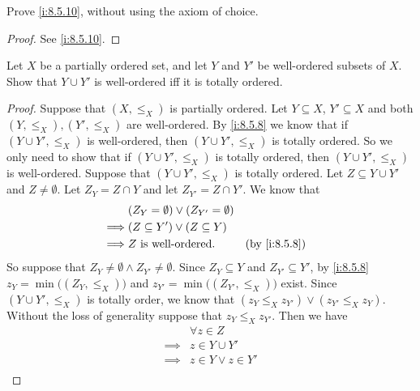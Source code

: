 \begin{ex}\label{i:ex:8.5.10}
  Prove \cref{i:8.5.10}, without using the axiom of choice.
\end{ex}

\begin{proof}
  See \cref{i:8.5.10}.
\end{proof}

\begin{ex}\label{i:ex:8.5.11}
  Let \(X\) be a partially ordered set, and let \(Y\) and \(Y'\) be well-ordered subsets of \(X\).
  Show that \(Y \cup Y'\) is well-ordered iff it is totally ordered.
\end{ex}

\begin{proof}
  Suppose that \((X, \leq_X)\) is partially ordered.
  Let \(Y \subseteq X\), \(Y' \subseteq X\) and both \((Y, \leq_X), (Y', \leq_X)\) are well-ordered.
  By \cref{i:8.5.8} we know that if \((Y \cup Y', \leq_X)\) is well-ordered, then \((Y \cup Y', \leq_X)\) is totally ordered.
  So we only need to show that if \((Y \cup Y', \leq_X)\) is totally ordered, then \((Y \cup Y', \leq_X)\) is well-ordered.
  Suppose that \((Y \cup Y', \leq_X)\) is totally ordered.
  Let \(Z \subseteq Y \cup Y'\) and \(Z \neq \emptyset\).
  Let \(Z_Y = Z \cap Y\) and let \(Z_{Y'} = Z \cap Y'\).
  We know that
  \begin{align*}
             & (Z_Y = \emptyset) \lor (Z_{Y'} = \emptyset)                   \\
    \implies & (Z \subseteq Y') \lor (Z \subseteq Y)                         \\
    \implies & Z \text{ is well-ordered}.                  &  & \by{i:8.5.8}
  \end{align*}
  So suppose that \(Z_Y \neq \emptyset \land Z_{Y'} \neq \emptyset\).
  Since \(Z_Y \subseteq Y\) and \(Z_{Y'} \subseteq Y'\), by \cref{i:8.5.8} \(z_Y = \min\big((Z_Y, \leq_X)\big)\) and \(z_{Y'} = \min\big((Z_{Y'}, \leq_X)\big)\) exist.
  Since \((Y \cup Y', \leq_X)\) is totally order, we know that \((z_Y \leq_X z_{Y'}) \lor (z_{Y'} \leq_X z_Y)\).
  Without the loss of generality suppose that \(z_Y \leq_X z_{Y'}\).
  Then we have
  \begin{align*}
             & \forall z \in Z                                                    \\
    \implies & z \in Y \cup Y'                                                    \\
    \implies & z \in Y \lor z \in Y'                                              \\

\end{align*}
\end{proof}
